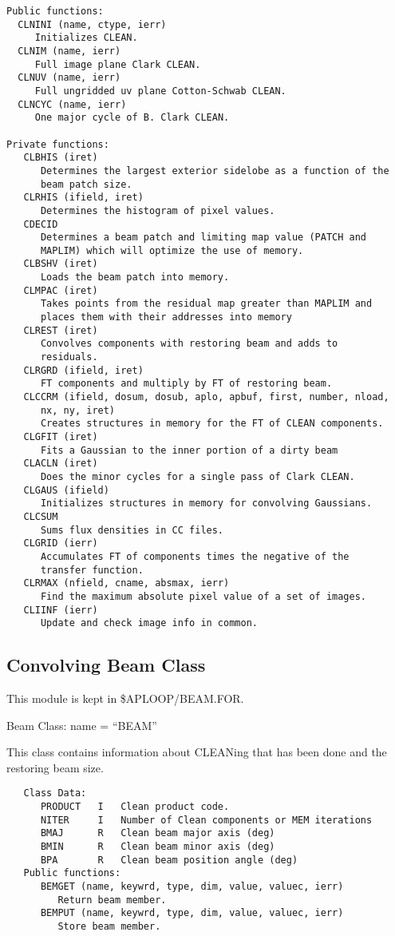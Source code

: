 {\small\begin{verbatim}
Public functions:
  CLNINI (name, ctype, ierr)
     Initializes CLEAN.
  CLNIM (name, ierr)
     Full image plane Clark CLEAN.
  CLNUV (name, ierr)
     Full ungridded uv plane Cotton-Schwab CLEAN.
  CLNCYC (name, ierr)
     One major cycle of B. Clark CLEAN.

Private functions:
   CLBHIS (iret)
      Determines the largest exterior sidelobe as a function of the
      beam patch size.
   CLRHIS (ifield, iret)
      Determines the histogram of pixel values.
   CDECID
      Determines a beam patch and limiting map value (PATCH and
      MAPLIM) which will optimize the use of memory.
   CLBSHV (iret)
      Loads the beam patch into memory.
   CLMPAC (iret)
      Takes points from the residual map greater than MAPLIM and
      places them with their addresses into memory
   CLREST (iret)
      Convolves components with restoring beam and adds to
      residuals.
   CLRGRD (ifield, iret)
      FT components and multiply by FT of restoring beam.
   CLCCRM (ifield, dosum, dosub, aplo, apbuf, first, number, nload,
      nx, ny, iret)
      Creates structures in memory for the FT of CLEAN components.
   CLGFIT (iret)
      Fits a Gaussian to the inner portion of a dirty beam
   CLACLN (iret)
      Does the minor cycles for a single pass of Clark CLEAN.
   CLGAUS (ifield)
      Initializes structures in memory for convolving Gaussians.
   CLCSUM
      Sums flux densities in CC files.
   CLGRID (ierr)
      Accumulates FT of components times the negative of the
      transfer function.
   CLRMAX (nfield, cname, absmax, ierr)
      Find the maximum absolute pixel value of a set of images.
   CLIINF (ierr)
      Update and check image info in common.
\end{verbatim}}

\subsection{Convolving Beam Class}

   This module is kept in \$APLOOP/BEAM.FOR.

   Beam Class:  name = ``BEAM''

   This class contains information about CLEANing that has been done
and the restoring beam size.
{\small\begin{verbatim}
   Class Data:
      PRODUCT   I   Clean product code.
      NITER     I   Number of Clean components or MEM iterations
      BMAJ      R   Clean beam major axis (deg)
      BMIN      R   Clean beam minor axis (deg)
      BPA       R   Clean beam position angle (deg)
   Public functions:
      BEMGET (name, keywrd, type, dim, value, valuec, ierr)
         Return beam member.
      BEMPUT (name, keywrd, type, dim, value, valuec, ierr)
         Store beam member.
\end{verbatim}}

